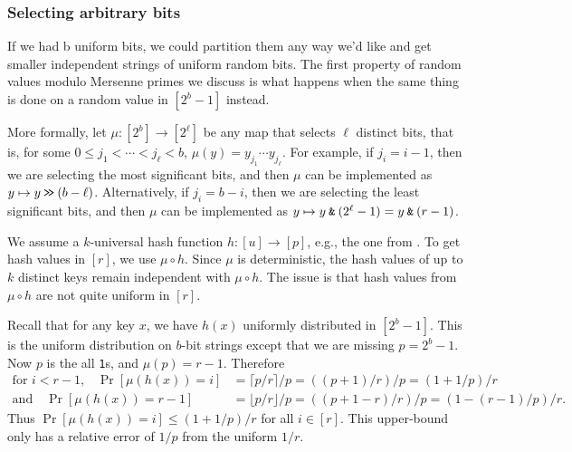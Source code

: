 

\subsubsection{Selecting arbitrary bits}\label{sec:power-of-two}
If we had b uniform bits, we could partition them any way we’d like and get smaller independent
strings of uniform random bits. The first property of random values modulo Mersenne primes
we discuss is what happens when the same thing is done on a random value in $[2^b - 1]$ instead.

More formally, let $\mu:[2^b]\to[2^\ell]$ be any map that selects
$\ell$ distinct bits, that is, for some $0\leq j_1<\cdots<j_{\ell}<b$,
$\mu(y)=y_{j_1}\cdots y_{j_\ell}$. For example, if $j_i=i-1$, then we
are selecting the most significant bits, and then $\mu$ can be
implemented as $y\mapsto y\mathbin{\texttt{>\!>}} (b-\ell)$. Alternatively, if $j_i=b-i$,
then we are selecting the least significant bits, and then $\mu$ can
be implemented as $y\mapsto y\mathbin{\texttt{\&}} (2^\ell-1)=y\mathbin{\texttt{\&}} (r-1)$.


We assume a $k$-universal hash function $h:[u]\to[p]$, e.g.,
the one from . To get hash values in $[r]$,
we use $\mu\circ h$. Since $\mu$ is deterministic,
the hash values of up to $k$ distinct keys remain
independent with $\mu\circ h$. The issue is that hash values from
$\mu\circ h$ are not quite uniform in $[r]$.

Recall that for any key $x$, we have $h(x)$ uniformly distributed in $[2^b-1]$.
This is the uniform distribution on $b$-bit strings except that we are
missing $p=2^b-1$. Now $p$ is the all \texttt{1}s, and
$\mu(p) = r-1$.
Therefore
\begin{align}
	\text{for $i < r-1$,}\quad
	\Pr[\mu(h(x))=i]
	 & =\lceil p/r\rceil/p
	=((p+1)/r)/p
	=(1+1/p)/r
	\label{eq:coll-ell<r-1}
	\\
	\text{and}\quad
	\Pr[\mu(h(x))=r-1]
	 & =\lfloor p/r\rfloor/p=((p+1-r)/r)/p
	=(1-(r-1)/p)/r.
	\label{eq:coll-ell=r-1}
\end{align}
Thus $\Pr[\mu(h(x))=i]\leq (1+1/p)/r$ for all $i\in[r]$. This upper-bound
only has a relative error of $1/p$ from the uniform $1/r$.

